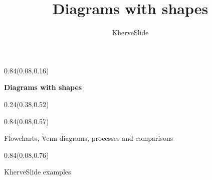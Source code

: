 \documentclass[aspectratio=169]{beamer}
\title{Diagrams with shapes}
\author{KherveSlide}
\begin{document}
\begin{frame}[t]

\begin{textblock}{0.84}(0.08,0.16)
{\centering\fontsize{32}{38}\selectfont \textcolor[HTML]{1A1A1A}{\textbf{Diagrams with shapes}}\par}
\end{textblock}

\begin{textblock}{0.24}(0.38,0.52)
\end{textblock}

\begin{textblock}{0.84}(0.08,0.57)
{\centering\fontsize{17}{20}\selectfont \textcolor[HTML]{555555}{Flowcharts, Venn diagrams, processes and comparisons}\par}
\end{textblock}

\begin{textblock}{0.84}(0.08,0.76)
{\centering\fontsize{13}{16}\selectfont \textcolor[HTML]{555555}{KherveSlide examples}\par}
\end{textblock}
\end{frame}
\end{document}
